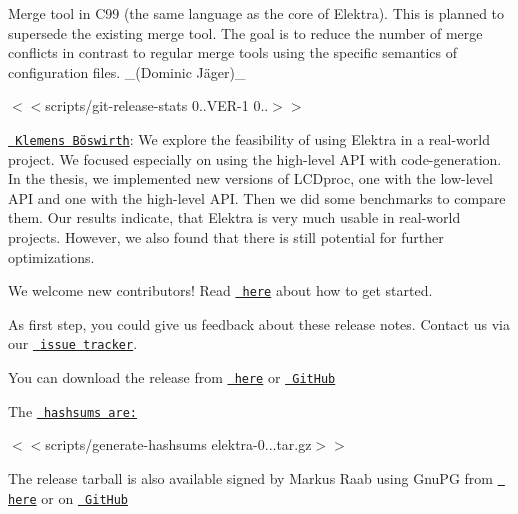 \begin{DoxyItemize}
\item Merge tool in C99 (the same language as the core of Elektra). This is planned to supersede the existing merge tool. The goal is to reduce the number of merge conflicts in contrast to regular merge tools using the specific semantics of configuration files. \+\_\+(Dominic Jäger)\+\_\+
\end{DoxyItemize}

$<$$<${\ttfamily scripts/git-\/release-\/stats 0..\+V\+ER-\/1 0..}$>$$>$


\begin{DoxyItemize}
\item \href{https://www.libelektra.org/ftp/elektra/publications/boeswirth2019highlevel.pdf}{\texttt{ Klemens Böswirth}}\+: We explore the feasibility of using Elektra in a real-\/world project. We focused especially on using the high-\/level A\+PI with code-\/generation. In the thesis, we implemented new versions of L\+C\+Dproc, one with the low-\/level A\+PI and one with the high-\/level A\+PI. Then we did some benchmarks to compare them. Our results indicate, that Elektra is very much usable in real-\/world projects. However, we also found that there is still potential for further optimizations.
\end{DoxyItemize}

We welcome new contributors! Read \href{https://www.libelektra.org/devgettingstarted/ideas}{\texttt{ here}} about how to get started.

As first step, you could give us feedback about these release notes. Contact us via our \href{https://issues.libelektra.org}{\texttt{ issue tracker}}.

You can download the release from \href{https://www.libelektra.org/ftp/elektra/releases/elektra-0.9.1.tar.gz}{\texttt{ here}} or \href{https://github.com/ElektraInitiative/ftp/blob/master/releases/elektra-0.9.1.tar.gz?raw=true}{\texttt{ Git\+Hub}}

The \href{https://github.com/ElektraInitiative/ftp/blob/master/releases/elektra-0.9.1.tar.gz.hashsum?raw=true}{\texttt{ hashsums are\+:}}

$<$$<${\ttfamily scripts/generate-\/hashsums elektra-\/0...\+tar.\+gz}$>$$>$

The release tarball is also available signed by Markus Raab using Gnu\+PG from \href{https://www.libelektra.org/ftp/elektra/releases/elektra-0.9.1.tar.gz.gpg}{\texttt{ here}} or on \href{https://github.com/ElektraInitiative/ftp/blob/master/releases/elektra-0.9.1.tar.gz.gpg?raw=true}{\texttt{ Git\+Hub}}

